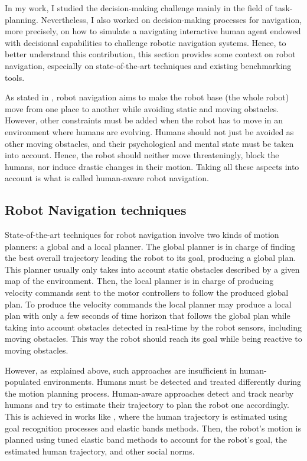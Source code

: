 In my work, I studied the decision-making challenge mainly in the field of task-planning. 
Nevertheless, I also worked on decision-making processes for navigation, more precisely, on how to simulate a navigating interactive human agent endowed with decisional capabilities to challenge robotic navigation systems. Hence, to better understand this contribution, this section provides some context on robot navigation, especially on state-of-the-art techniques and existing benchmarking tools.

As stated in \cite{thesisBuisan21}, robot navigation aims to make the robot base (the whole robot) move from one place to another while avoiding static and moving obstacles. However, other constraints must be added when the robot has to move in an environment where humans are evolving. 
Humans should not just be avoided as other moving obstacles, and their psychological and mental state must be taken into account. Hence, the robot should neither move threateningly, block the humans, nor induce drastic changes in their motion. Taking all these aspects into account is what is called human-aware robot navigation.

\subsection{Robot Navigation techniques}

State-of-the-art techniques for robot navigation involve two kinds of motion planners: a global and a local planner. The global planner is in charge of finding the best overall trajectory leading the robot to its goal, producing a global plan. This planner usually only takes into account static obstacles described by a given map of the environment. Then, the local planner is in charge of producing velocity commands sent to the motor controllers to follow the produced global plan. To produce the velocity commands the local planner may produce a local plan with only a few seconds of time horizon that follows the global plan while taking into account obstacles detected in real-time by the robot sensors, including moving obstacles. This way the robot should reach its goal while being reactive to moving obstacles. 

However, as explained above, such approaches are insufficient in human-populated environments. Humans must be detected and treated differently during the motion planning process. Human-aware approaches detect and track nearby humans and try to estimate their trajectory to plan the robot one accordingly. This is achieved in works like \cite{singamaneni2021human}, where the human trajectory is estimated using goal recognition processes and elastic bands methods. Then, the robot's motion is planned using tuned elastic band methods to account for the robot's goal, the estimated human trajectory, and other social norms.   

